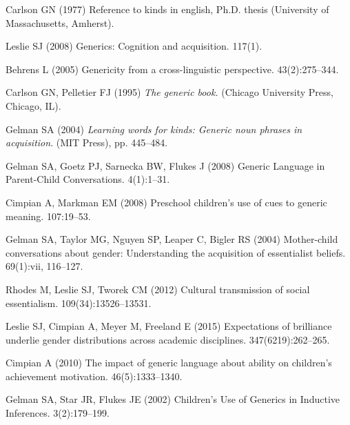 \documentclass{pnastwo}
\begin{document}
\begin{article}
\begin{acknowledgments}
\end{acknowledgments}

\begin{thebibliography}{10}

Carlson GN (1977) Reference to kinds in english, Ph.D. thesis (University of Massachusetts, Amherst).

Leslie SJ (2008) {Generics: Cognition and acquisition}.
 117(1).

Behrens L (2005) {Genericity from a cross-linguistic perspective}.
 43(2):275--344.

Carlson GN, Pelletier FJ (1995) {\em The generic book.}
\newblock (Chicago University Press, Chicago, IL).

Gelman SA (2004) {\em Learning words for kinds: Generic noun phrases in
  acquisition}.
\newblock (MIT Press), pp. 445--484.

Gelman SA, Goetz PJ, Sarnecka BW, Flukes J (2008) {Generic Language in
  Parent-Child Conversations}.
 4(1):1--31.

Cimpian A, Markman EM (2008) {Preschool children's use of cues to generic
  meaning}.
 107:19--53.

Gelman SA, Taylor MG, Nguyen SP, Leaper C, Bigler RS (2004) {Mother-child
  conversations about gender: Understanding the acquisition of essentialist
  beliefs}.
  69(1):vii, 116--127.

Rhodes M, Leslie SJ, Tworek CM (2012) {Cultural transmission of social
  essentialism}.
  109(34):13526--13531.

Leslie SJ, Cimpian A, Meyer M, Freeland E (2015) {Expectations of brilliance
  underlie gender distributions across academic disciplines}.
 347(6219):262--265.

Cimpian A (2010) {The impact of generic language about ability on children's
  achievement motivation.}
 46(5):1333--1340.

Gelman SA, Star JR, Flukes JE (2002) {Children's Use of Generics in Inductive
  Inferences}.
 3(2):179--199.


\end{thebibliography}
\end{article}
\end{document}
